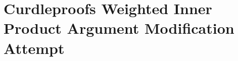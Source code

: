 
\section{Curdleproofs Weighted Inner Product Argument Modification Attempt}\label{sec:curdleproofs-weighted-inner-product-argument-modification-attempt}
